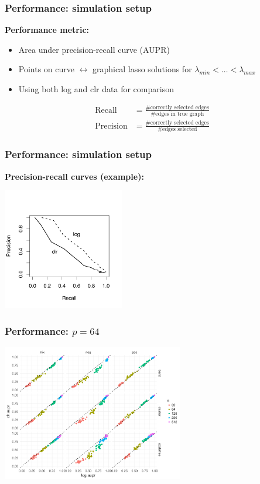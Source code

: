 \documentclass{beamer}
\begin{document}
\begin{frame}
\frametitle{Performance: simulation setup}
\textbf{Performance metric:}
\begin{itemize}
\item Area under precision-recall curve (AUPR)
\item Points on curve $\leftrightarrow$ graphical lasso solutions for $\lambda_{min} < \dots < \lambda_{max}$
\item Using both log and clr data for comparison
\end{itemize}
\begin{align*}
\text{Recall} &= \frac{\text{\# correctly selected edges}}{\text{\# edges in true graph}} \\
\text{Precision} &= \frac{\text{\# correctly selected edges}}{\text{\# edges selected}}
\end{align*}
\end{frame}

\begin{frame}
\frametitle{Performance: simulation setup}
\textbf{Precision-recall curves (example):}
\begin{center}
\includegraphics[width=200px]{figs/pr-curve.pdf}
\end{center}
\end{frame}

\begin{frame}
\frametitle{Performance: $p = 64$}
\begin{center}
\includegraphics[width=300px]{figs/glasso-64.pdf}
\end{center}
\end{frame}
\end{document}
